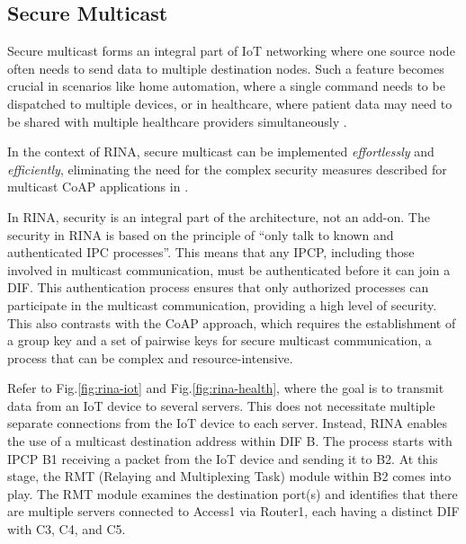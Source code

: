 \documentclass{ieeeaccess}
\begin{document}
\subsection{Secure Multicast}
Secure multicast forms an integral part of IoT networking where one source node often needs to send data to multiple destination nodes. Such a feature becomes crucial in scenarios like home automation, where a single command needs to be dispatched to multiple devices, or in healthcare, where patient data may need to be shared with multiple healthcare providers simultaneously \cite{park2020security}.

In the context of RINA, secure multicast can be implemented \textit{effortlessly} and \textit{efficiently}, eliminating the need for the complex security measures described for multicast CoAP applications in \cite{park2020security}.

In RINA, security is an integral part of the architecture, not an add-on. The security in RINA is based on the principle of ``only talk to known and authenticated IPC processes''. This means that any IPCP, including those involved in multicast communication, must be authenticated before it can join a DIF. This authentication process ensures that only authorized processes can participate in the multicast communication, providing a high level of security. This also contrasts with the CoAP approach, which requires the establishment of a group key and a set of pairwise keys for secure multicast communication, a process that can be complex and resource-intensive.

Refer to Fig.\ref{fig:rina-iot} and Fig.\ref{fig:rina-health}, where the goal is to transmit data from an IoT device to several servers. This does not necessitate multiple separate connections from the IoT device to each server. Instead, RINA enables the use of a multicast destination address within DIF B. The process starts with IPCP B1 receiving a packet from the IoT device and sending it to B2. At this stage, the RMT (Relaying and Multiplexing Task) module within B2 comes into play. The RMT module examines the destination port(s) and identifies that there are multiple servers connected to Access1 via Router1, each having a distinct DIF with C3, C4, and C5.
\end{document}
